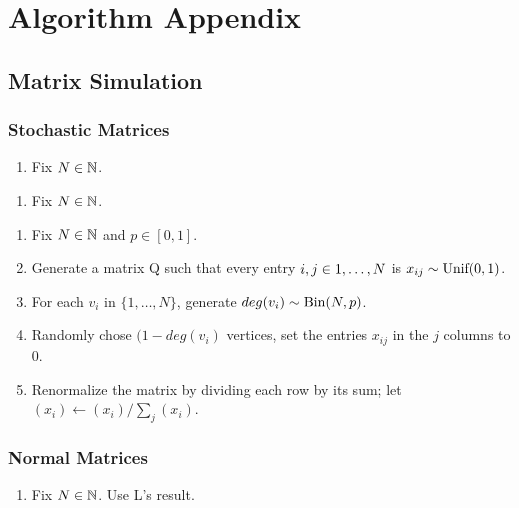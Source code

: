 
\chapter{Algorithm Appendix}


\section{Matrix Simulation}
\subsection{Stochastic Matrices}
\begin{algorithm} \hfill
\begin{enumerate}
	\item{Fix $N \in \N$}.
\end{enumerate}
\end{algorithm}

\begin{algorithm} \hfill
\begin{enumerate}
	\item{Fix $N \in \N$}.
\end{enumerate}
\end{algorithm}

\begin{algorithm} \hfill
\begin{enumerate}
	\item{Fix $N \in \N$ and $p \in [0,1]$}.
	\item{Generate a matrix Q such that every entry $i,j\in \oneto[N]$ is $x_{ij} \sim \Unif(0,1)$.}
	\item{For each $v_i$ in $\{1,\dots,N\}$, generate $deg(v_i) \sim \Bin(N,p)$.}
	\item{Randomly chose $(1-deg(v_i)$ vertices, set the entries $x_{ij}$ in the $j$ columns to 0.}
	\item{Renormalize the matrix by dividing each row by its sum; let $(x_i) \leftarrow (x_i)/\sum_j(x_i)$}.
\end{enumerate}
\end{algorithm}
\subsection{Normal Matrices}
\begin{algorithm} \hfill
\begin{enumerate}
	\item{Fix $N \in \N$}. Use L's result.
\end{enumerate}
\end{algorithm}

